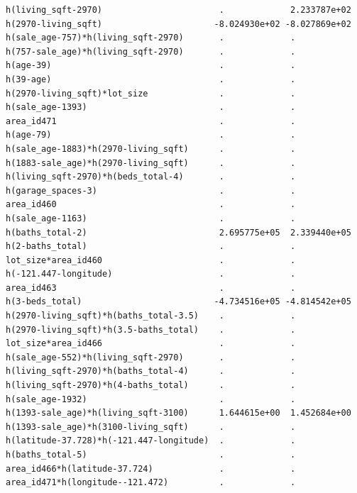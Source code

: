 \documentclass[
]{article}
\begin{document}
\begin{verbatim}
h(living_sqft-2970)                       .             2.233787e+02
h(2970-living_sqft)                      -8.024930e+02 -8.027869e+02
h(sale_age-757)*h(living_sqft-2970)       .             .           
h(757-sale_age)*h(living_sqft-2970)       .             .           
h(age-39)                                 .             .           
h(39-age)                                 .             .           
h(2970-living_sqft)*lot_size              .             .           
h(sale_age-1393)                          .             .           
area_id471                                .             .           
h(age-79)                                 .             .           
h(sale_age-1883)*h(2970-living_sqft)      .             .           
h(1883-sale_age)*h(2970-living_sqft)      .             .           
h(living_sqft-2970)*h(beds_total-4)       .             .           
h(garage_spaces-3)                        .             .           
area_id460                                .             .           
h(sale_age-1163)                          .             .           
h(baths_total-2)                          2.695775e+05  2.339440e+05
h(2-baths_total)                          .             .           
lot_size*area_id460                       .             .           
h(-121.447-longitude)                     .             .           
area_id463                                .             .           
h(3-beds_total)                          -4.734516e+05 -4.814542e+05
h(2970-living_sqft)*h(baths_total-3.5)    .             .           
h(2970-living_sqft)*h(3.5-baths_total)    .             .           
lot_size*area_id466                       .             .           
h(sale_age-552)*h(living_sqft-2970)       .             .           
h(living_sqft-2970)*h(baths_total-4)      .             .           
h(living_sqft-2970)*h(4-baths_total)      .             .           
h(sale_age-1932)                          .             .           
h(1393-sale_age)*h(living_sqft-3100)      1.644615e+00  1.452684e+00
h(1393-sale_age)*h(3100-living_sqft)      .             .           
h(latitude-37.728)*h(-121.447-longitude)  .             .           
h(baths_total-5)                          .             .           
area_id466*h(latitude-37.724)             .             .           
area_id471*h(longitude--121.472)          .             .           
                                                                    

\end{verbatim}
\end{document}
